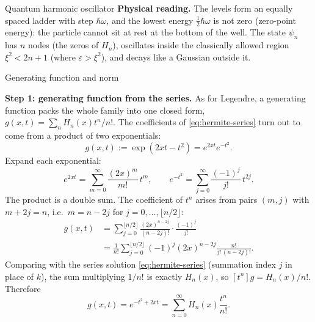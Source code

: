 \documentclass[11pt]{beamer}
\begin{document}
\begin{frame}[allowframebreaks=1.00]{Quantum harmonic oscillator}
\textbf{Physical reading.} The levels form an equally spaced ladder with step $\hbar\omega$,
and the lowest energy $\tfrac12\hbar\omega$ is not zero (zero-point energy): the particle cannot
sit at rest at the bottom of the well. The state $\psi_n$ has $n$ nodes (the zeros of $H_n$),
oscillates inside the classically allowed region $\xi^2<2n+1$ (where $\varepsilon>\xi^2$), and
decays like a Gaussian outside it.

\end{frame}

\begin{frame}[allowframebreaks=1.00]{Generating function and norm}
\footnotesize

\textbf{Step 1: generating function from the series.}  As for Legendre, a generating
function packs the whole family into one closed form, $g(x,t)=\sum_nH_n(x)t^n/n!$.
The coefficients of \eqref{eq:hermite-series} turn out to come from a product of two
exponentials:
\[
  g(x,t):=\exp(2xt-t^2)=e^{2xt}e^{-t^2}.
\]
Expand each exponential:
\[
  e^{2xt}=\sum_{m=0}^{\infty}\frac{(2x)^m}{m!}\,t^m,
  \qquad
  e^{-t^2}=\sum_{j=0}^{\infty}\frac{(-1)^j}{j!}\,t^{2j}.
\]
The product is a double sum.  The coefficient of $t^n$ arises from pairs $(m,j)$ with
$m+2j=n$, i.e.\ $m=n-2j$ for $j=0,\ldots,\lfloor n/2\rfloor$:
\begin{align*}
  [t^n]g(x,t)
  &=\sum_{j=0}^{\lfloor n/2\rfloor}
      \frac{(2x)^{n-2j}}{(n-2j)!}\cdot\frac{(-1)^j}{j!}\\
  &=\frac{1}{n!}
    \sum_{j=0}^{\lfloor n/2\rfloor}
      (-1)^j(2x)^{n-2j}\frac{n!}{j!\,(n-2j)!}.
\end{align*}
Comparing with the series solution \eqref{eq:hermite-series} (summation index $j$ in place of $k$),
the sum multiplying $1/n!$ is exactly $H_n(x)$, so $[t^n]g=H_n(x)/n!$.  Therefore
\begin{equation}
  g(x,t)=e^{-t^2+2xt}
  =\sum_{n=0}^{\infty}H_n(x)\frac{t^n}{n!}.
  \label{eq:hermite-gen}
\end{equation}


\end{frame}
\end{document}
